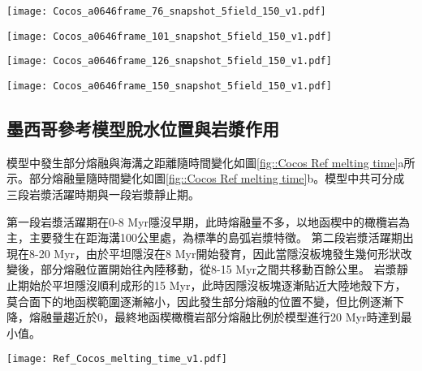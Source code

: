 \begin{figure*}[htp]
    \centering
    \texttt{[image: Cocos\_a0646frame\_76\_snapshot\_5field\_150\_v1.pdf]}
    \caption[墨西哥參考模型於15 Myr時之結果]{墨西哥參考模型於15 Myr時之結果。}
    \label{fig::Ref Cocos 76}
\end{figure*}

\begin{figure*}[htp]
    \centering
    \texttt{[image: Cocos\_a0646frame\_101\_snapshot\_5field\_150\_v1.pdf]}
    \caption[墨西哥參考模型於20 Myr時之結果]{墨西哥參考模型於20 Myr時之結果。}
    \label{fig::Ref Cocos 101}
\end{figure*}

\begin{figure*}[htp]
    \centering
    \texttt{[image: Cocos\_a0646frame\_126\_snapshot\_5field\_150\_v1.pdf]}
    \caption[墨西哥參考模型於25 Myr時之結果]{墨西哥參考模型於25 Myr時之結果。}
    \label{fig::Ref Cocos 126}
\end{figure*}

\begin{figure*}[htp]
    \centering
    \texttt{[image: Cocos\_a0646frame\_150\_snapshot\_5field\_150\_v1.pdf]}
    \caption[墨西哥參考模型於30 Myr時之結果]{墨西哥參考模型於30 Myr時之結果。}
    \label{fig::Ref Cocos 150}
\end{figure*}

\newpage
\subsection{墨西哥參考模型脫水位置與岩漿作用}
模型中發生部分熔融與海溝之距離隨時間變化如圖\ref{fig::Cocos Ref melting time}a所示。部分熔融量隨時間變化如圖\ref{fig::Cocos Ref melting time}b。模型中共可分成三段岩漿活躍時期與一段岩漿靜止期。

第一段岩漿活躍期在0-8 Myr隱沒早期，此時熔融量不多，以地函楔中的橄欖岩為主，主要發生在距海溝100公里處，為標準的島弧岩漿特徵。
第二段岩漿活躍期出現在8-20 Myr，由於平坦隱沒在8 Myr開始發育，因此當隱沒板塊發生幾何形狀改變後，部分熔融位置開始往內陸移動，從8-15 Myr之間共移動百餘公里。
岩漿靜止期始於平坦隱沒順利成形的15 Myr，此時因隱沒板塊逐漸貼近大陸地殼下方，莫合面下的地函楔範圍逐漸縮小，因此發生部分熔融的位置不變，但比例逐漸下降，熔融量趨近於0，最終地函楔橄欖岩部分熔融比例於模型進行20 Myr時達到最小值。
\begin{figure*}[h]
    \centering
    \texttt{[image: Ref\_Cocos\_melting\_time\_v1.pdf]}
    \caption[墨西哥參考模型岩漿作用隨時間變化]{墨西哥參考模型岩漿作用隨時間變化，灰色底標出平坦隱沒發育後時間段。(a)部分熔融與海溝之距離隨時間變化圖，縱軸中每個點代表每次部分熔融發生位置，顏色為指數上的部分熔融比例。(b)岩石熔融量隨時間變化圖，熔融量單位為每單位海溝產生之立方公里量中每20萬年瞬時量。顏色代表不同岩相。}
    \label{fig::Cocos Ref melting time}
\end{figure*}

